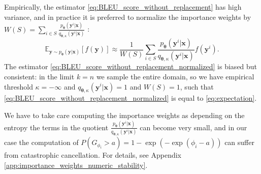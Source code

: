 Empirically, the estimator \eqref{eq:BLEU_score_without_replacement} has high variance, and in practice it is preferred to normalize the importance weights by $W(S) = \sum_{i \in S}  \frac{p_{\bm{\theta}}(\bm{y}^i|\bm{x})}{q_{\bm{\theta},\kappa}(\bm{y}^i|\bm{x})}$ \citep{hesterberg1988advances}:
\begin{equation}
\label{eq:BLEU_score_without_replacement_normalized}
    \mathbb{E}_{\bm{y} \sim p_{\bm{\theta}}(\bm{y}|\bm{x})} \left[f(\bm{y})\right] \approx \frac{1}{W(S)} \sum_{i \in S}  \frac{p_{\bm{\theta}}(\bm{y}^i|\bm{x})}{q_{\bm{\theta},\kappa}(\bm{y}^i|\bm{x})}f(\bm{y}^i).
\end{equation}
The estimator \eqref{eq:BLEU_score_without_replacement_normalized} is biased but consistent: in the limit $k = n$ we sample the entire domain, so we have empirical threshold $\kappa = -\infty$ and $q_{\bm{\theta},\kappa}(\bm{y}^i|\bm{x}) = 1$ and $W(S) = 1$, such that \eqref{eq:BLEU_score_without_replacement_normalized} is equal to \eqref{eq:expectation}.

We have to take care computing the importance weights as depending on the entropy the terms in the quotient $\frac{p_{\bm{\theta}}(\bm{y}^i|\bm{x})}{q_{\bm{\theta},\kappa}(\bm{y}^i|\bm{x})}$ can become very small, and in our case the computation of $P(G_{\phi_i} > a) = 1 - \exp (-\exp(\phi_i - a))$ can suffer from catastrophic cancellation. For details, see Appendix \ref{app:importance_weights_numeric_stability}.

